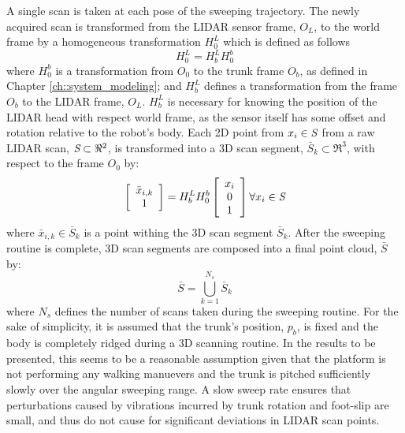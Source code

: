 			A single scan is taken at each \Kth pose of the sweeping trajectory. The newly acquired scan is transformed from the LIDAR sensor frame, $O_{L}$, to the world frame by a homogeneous transformation $H^{L}_{0}$ which is defined as follows
				\begin{equation}
					H^{L}_{0} = H^{L}_{b} H^{b}_{0}
					\label{eq::world_to_sensor}
				\end{equation}
			where $H^{b}_{0}$ is a transformation from $O_{0}$ to the trunk frame $O_{b}$, as defined in Chapter \ref{ch::system_modeling}; and $H^{L}_{b}$ defines a transformation from the frame $O_{b}$ to the LIDAR frame, $O_{L}$. $H^{L}_{b}$ is necessary for knowing the position of the LIDAR head with respect world frame, as the sensor itself has some offset and rotation relative to the robot's body. Each 2D point from $x_{i} \in \emph{S}$ from a raw LIDAR scan, $\emph{S} \subset \Re^{2}$, is transformed into a 3D scan segment, $\bar{S}_{k} \subset \Re^{3}$, with respect to the frame $O_{0}$ by:
				\begin{equation}
					\left[
						\begin{array}{c}
							\bar{x}_{i,k} \\ 1
						\end{array}
					\right]
				 = H^{L}_{b} H^{b}_{0}	
					\left[
						\begin{array}{c}
							x_{i} \\ 0 \\ 1
						\end{array}
					\right] \forall x_{i} \in \emph{S}
					\label{eq::scan_to_segment}
				\end{equation}
			where $\bar{x}_{i,k} \in \bar{S}_{k}$ is a point withing the \Kth 3D scan segment $\bar{S}_{k}$. After the sweeping routine is complete, 3D scan segments are composed into a final point cloud, $\bar{S}$ by:
			\begin{equation}
				\bar{S} = \bigcup_{k=1}^{N_{s}} \bar{S}_{k}
			\end{equation}
			where $N_{s}$ defines the number of scans taken during the sweeping routine. For the sake of simplicity, it is assumed that the trunk's position, $p_{b}$, is fixed and the body is completely ridged during a 3D scanning routine. In the results to be presented, this seems to be a reasonable assumption given that the platform is not performing any walking manuevers and the trunk is pitched sufficiently slowly over the angular sweeping range. A slow sweep rate ensures that perturbations caused by vibrations incurred by trunk rotation and foot-slip are small, and thus do not cause for significant deviations in LIDAR scan points.
